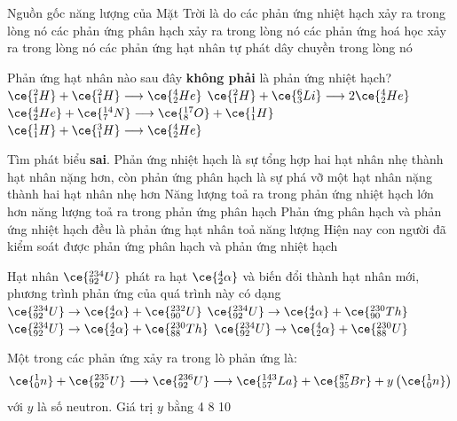 \begin{ex}
	Nguồn gốc năng lượng của Mặt Trời là do
	\choice
	{\True các phản ứng nhiệt hạch xảy ra trong lòng nó}
	{các phản ứng phân hạch xảy ra trong lòng nó}
	{các phản ứng hoá học xảy ra trong lòng nó}
	{các phản ứng hạt nhân tự phát dây chuyền trong lòng nó}
	\loigiai{}
\end{ex}
\begin{ex}
	Phản ứng hạt nhân nào sau đây \textbf{không phải} là phản ứng nhiệt hạch?
	\choice
	{$\ce{_1^2H}+\ce{_1^2H} \longrightarrow\ce{_2^4He}$}
	{$\ce{_1^2H}+\ce{_3^6Li} \longrightarrow 2\ce{_2^4He}$}
	{\True $\ce{_2^4He}+\ce{_7^{14}N} \longrightarrow\ce{_8^{17}O}+\ce{_1^1H}$}
	{$\ce{_1^1H}+\ce{_1^3H} \longrightarrow\ce{_2^4He}$}
	\loigiai{}
\end{ex}
\begin{ex}
	Tìm phát biểu \textbf{sai}.
	\choice
	{Phản ứng nhiệt hạch là sự tổng hợp hai hạt nhân nhẹ thành hạt nhân nặng hơn, còn phản ứng phân hạch là sự phá vỡ một hạt nhân nặng thành hai hạt nhân nhẹ hơn}
	{Năng lượng toả ra trong phản ứng nhiệt hạch lớn hơn năng lượng toả ra trong phản ứng phân hạch}
	{Phản ứng phân hạch và phản ứng nhiệt hạch đều là phản ứng hạt nhân toả năng lượng}
	{\True Hiện nay con người đã kiểm soát được phản ứng phân hạch và phản ứng nhiệt hạch}
\end{ex}
\begin{ex}
	Hạt nhân $\ce{_{92}^{234}U}$ phát ra hạt $\ce{_2^4\alpha}$ và biến đổi thành hạt nhân mới, phương trình phản ứng của quá trình này có dạng
	\choice
	{$\ce{_{92}^{234}U} \rightarrow\ce{_2^4\alpha}+\ce{_{90}^{232}U}$}
	{\True $\ce{_{92}^{234}U} \rightarrow\ce{_2^4\alpha}+\ce{_{90}^{230}Th}$}
	{$\ce{_{92}^{234}U} \rightarrow\ce{_2^4\alpha}+ \ce{_{88}^{230}Th}$}
	{$\ce{_{92}^{234}U} \rightarrow\ce{_2^4\alpha}+ \ce{_{88}^{230}U}$}
	\loigiai{}
\end{ex}
\begin{ex}
	Một trong các phản ứng xảy ra trong lò phản ứng là:
	$$
	\ce{_0^1n}+\ce{_{92}^{235}U} \longrightarrow\ce{_{92}^{236}U} \longrightarrow\ce{_{57}^{143}La}+\ce{_{35}^{87}Br}+y\left(\ce{_0^1n}\right)
	$$
	với $y$ là số neutron. Giá trị $y$ bằng
	\choice
	{4}
	{}
	{8}
	{10}
\end{ex}
